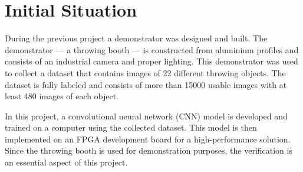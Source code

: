 \chapter{Initial Situation}
\label{ch:initial_situation}

During the previous project a demonstrator was designed and built.
The demonstrator --- a throwing booth --- is constructed from aluminium profiles and consists of an industrial camera and proper lighting.
This demonstrator was used to collect a dataset that contains images of 22 different throwing objects.
The dataset is fully labeled and consists of more than \num{15000} usable images with at least 480 images of each object.

In this project, a convolutional neural network (CNN) model is developed and trained on a computer using the collected dataset.
This model is then implemented on an FPGA development board for a high-performance solution.
Since the throwing booth is used for demonstration purposes, the verification is an essential aspect of this project.
